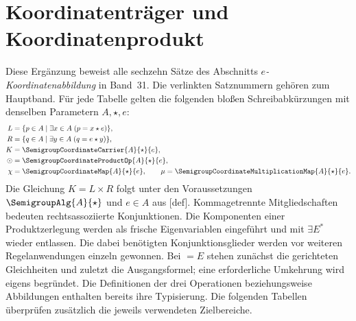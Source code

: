 \section{Koordinatenträger und Koordinatenprodukt}

Diese Ergänzung beweist alle sechzehn Sätze des Abschnitts
\emph{\(e\)-Koordinaten\-abbildung} in Band~31.
Die verlinkten Satznummern gehören zum Hauptband. Für jede Tabelle gelten
die folgenden bloßen Schreibabkürzungen mit denselben Parametern
\(A,\star,e\):
\[
\begin{aligned}
L&=\{p\in A\mid\exists x\in A\;(p=x\star e)\},\\
R&=\{q\in A\mid\exists y\in A\;(q=e\star y)\},\\
K&=\SemigroupCoordinateCarrier{A}{\star}{e},\\
\odot&=\SemigroupCoordinateProductOp{A}{\star}{e},\\
\chi&=\SemigroupCoordinateMap{A}{\star}{e},\qquad
\mu=\SemigroupCoordinateMultiplicationMap{A}{\star}{e}.
\end{aligned}
\]
Die Gleichung \(K=L\times R\) folgt unter den Voraussetzungen
\(\SemigroupAlg{A}{\star}\) und \(e\in A\) aus
[def].
Kommagetrennte Mitgliedschaften bedeuten rechtsassoziierte Konjunktionen.
Die Komponenten einer Produktzerlegung werden als frische Eigenvariablen
eingeführt und mit \(\exists E^{*}\) wieder entlassen. Die dabei benötigten
Konjunktionsglieder werden vor weiteren Regelanwendungen einzeln gewonnen.
Bei \(=E\) stehen zunächst die gerichteten Gleichheiten und zuletzt die
Ausgangsformel; eine erforderliche Umkehrung wird eigens begründet.
Die Definitionen der drei Operationen beziehungsweise Abbildungen enthalten
bereits ihre Typisierung. Die folgenden Tabellen überprüfen zusätzlich
die jeweils verwendeten Zielbereiche.

